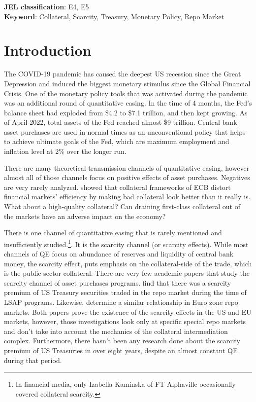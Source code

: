 \documentclass[11pt,a4paper,english,oneside]{article}
\begin{document}
\begin{flushleft}
  \textbf{JEL classification}: E4, E5\\
  \textbf{Keyword}: Collateral, Scarcity, Treasury, Monetary Policy, Repo Market
\end{flushleft}

\section{Introduction} \label{sec:introduction} %

The COVID-19 pandemic has caused the deepest US recession since the Great Depression and induced the biggest monetary stimulus since the Global Financial Crisis. One of the monetary policy tools that was activated during the pandemic was an additional round of quantitative easing. In the time of 4 months, the Fed's balance sheet had exploded from \$4.2 to \$7.1 trillion, and then kept growing. As of April 2022, total assets of the Fed reached almost \$9 trillion. Central bank asset purchases are used in normal times as an unconventional policy that helps to achieve ultimate goals of the Fed, which are maximum employment and inflation level at 2\% over the longer run.


There are many theoretical transmission channels of quantitative easing, however almost all of those channels focus on positive effects of asset purchases. Negatives are very rarely analyzed. \citet{nyborg2015} showed that collateral frameworks of ECB distort financial markets' efficiency by making bad collateral look better than it really is. What about a high-quality collateral? Can draining first-class collateral out of the markets have an adverse impact on the economy?

There is one channel of quantitative easing that is rarely mentioned and insufficiently studied.\footnote{In financial media, only Izabella Kaminska of FT Alphaville occasionally covered collateral scarcity.}. It is the scarcity channel (or scarcity effects). While most channels of QE focus on abundance of reserves and liquidity of central bank money, the scarcity effect, puts emphasis on the collateral-side of the trade, which is the public sector collateral. There are very few academic papers that study the scarcity channel of asset purchases programs. \citet{damico2014} find that there was a scarcity premium of US Treasury securities traded in the repo market during the time of LSAP programs. Likewise, \citet{arrata2018} determine a similar relationship in Euro zone repo markets. Both papers prove the existence of the scarcity effects in the US and EU markets, however, those investigations look only at specific special repo markets and don't take into account the mechanics of the collateral intermediation complex. Furthermore, there hasn't been any research done about the scarcity premium of US Treasuries in over eight years, despite an almost constant QE during that period.
\end{document}
